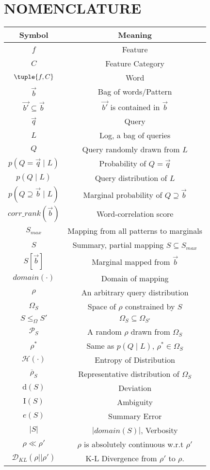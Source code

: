 \appendix
\section{NOMENCLATURE}
 \begin{tabular}{|c c|} 
 \hline
 \textbf{Symbol} & \textbf{Meaning}  \\ [0.5ex] 
 \hline\hline
 $f$ & Feature\\ 
 \hline
 $C$ & Feature Category\\
 \hline
  $\tuple{f,C}$ & Word\\
 \hline
 $\vec{b}$ & Bag of words/Pattern \\
 \hline
  $\vec{b'} \subseteq \vec{b}$ & $\vec{b'}$ is contained in $\vec{b}$\\
 \hline  
 $\vec{q}$ & Query\\
 \hline
 $L$ & Log, a bag of queries\\
  \hline
 $Q$ & Query randomly drawn from $L$\\
 \hline 
 $p(Q = \vec{q}\;|\;L)$ & Probability of $Q=\vec q$ \\
 \hline 
  $p(Q\;|\;L)$ & Query distribution of $L$\\
 \hline
 $p(Q\supseteq\vec{b}\;|\;L)$ & Marginal probability of $Q\supseteq\vec b$\\
 \hline
   $corr\_rank(\vec{b})$ & Word-correlation score\\ 
 \hline 
  $S_{max}$ & Mapping from all patterns to marginals\\
 \hline 
  $S$ & Summary, partial mapping $S\subseteq S_{max}$\\
  \hline 
    $S[\vec b]$ & Marginal mapped from $\vec b$\\
  \hline 
  $domain(\cdot)$ & Domain of mapping\\
 \hline
  $\rho$ & An arbitrary query distribution\\
 \hline
  $\Omega_S$ & Space of $\rho$ constrained by $S$\\
 \hline
   $S\leq_{\Omega}S'$ & $\Omega_{S}\subseteq\Omega_{S'}$\\ 
   \hline
   $\mathcal{P}_{S}$ & A random $\rho$ drawn from $\Omega_S$\\
  \hline 
  $\rho^*$ & Same as $p(Q\;|\;L)$, $\rho^*\in\Omega_S$\\
 \hline 
    $\mathcal{H}(\cdot)$ & Entropy of Distribution\\
 \hline 
  $\overline{\rho}_S$ & Representative distribution of $\Omega_S$\\
 \hline 
 $\text{d}(S)$ & Deviation\\
 \hline 
  $\text{I}(S)$ & Ambiguity\\
 \hline 
  $e(S)$ & Summary Error\\
 \hline
   $|S|$ & $|domain(S)|$, Verbosity\\
   \hline
  $\rho\ll\rho'$ & $\rho$ is absolutely continuous w.r.t $\rho'$\\
 \hline 
 $\mathcal{D}_{KL}(\rho||\rho')$ & K-L Divergence from $\rho'$ to $\rho$.\\
 \hline
\end{tabular}

